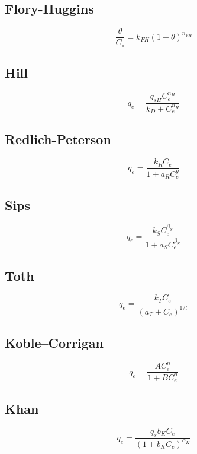 \documentclass[3p]{elsarticle}
\begin{document}
\subsection{Flory-Huggins}
\begin{equation}
\frac{\theta}{C_{\circ}} = k_{FH}\left(1 - \theta\right)^{n_{FH}}
\end{equation}

\subsection{Hill}
\begin{equation}
q_e = \frac{q_{sH}C_e^{n_H}}{k_D+C_e^{n_H}}
\end{equation}
\cite{Hill1910}

\subsection{Redlich-Peterson}
\begin{equation}
q_e = \frac{k_RC_e}{1 + a_RC_e^g}
\end{equation}
\cite{Redlich1959}

\subsection{Sips}
\begin{equation}
q_e = \frac{k_SC_e^{\beta_S}}{1 + a_SC_e^{\beta_S}}
\end{equation}
\cite{Sips1948}

\subsection{Toth}
\begin{equation}
q_e = \frac{k_TC_e}{\left(a_T+C_e\right)^{1/t}}
\end{equation}
\cite{Toth1971}

\subsection{Koble–Corrigan}
\begin{equation}
q_e = \frac{AC_e^n}{1+BC_e^n}
\end{equation}
\cite{Koble1952}

\subsection{Khan}
\begin{equation}
q_e = \frac{q_sb_KC_e}{\left(1+b_KC_e\right)^{\alpha_K}}
\end{equation}
\cite{Khan1997}
\end{document}
